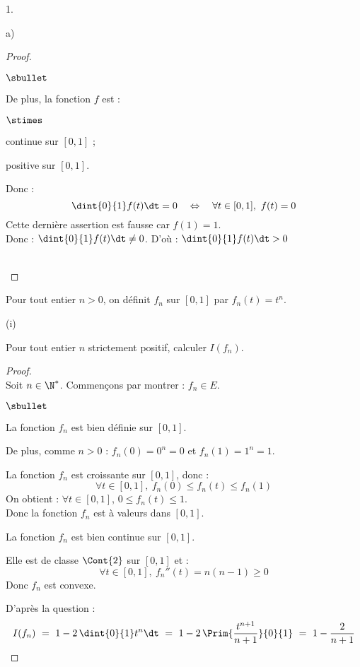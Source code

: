 \begin{noliste}{1.}
\begin{noliste}{a)}
\begin{proof}
\begin{noliste}{$\sbullet$}
      \item De plus, la fonction $f$ est :
      \begin{noliste}{$\stimes$}
	\item continue sur $[0,1]$ ;
	\item positive sur $[0,1]$.
      \end{noliste}
      Donc :
      \[
        \dint{0}{1} f(t) \dt = 0 \quad \Leftrightarrow \quad 
        \forall t \in [0,1], \ f(t)=0
      \]
      Cette dernière assertion est fausse car $f(1)=1$.\\
      Donc : $\dint{0}{1} f(t) \dt \neq 0$. D'où : 
      $\dint{0}{1} f(t) \dt >0$
    \end{noliste}
    ~\\[-1cm]
  \end{proof}

  
  \item Pour tout entier $n >0$, on définit $f_n$ sur $[0,1]$ par 
  $f_n(t)=t^n$.
  \begin{nonoliste}{(i)}
    \item Pour tout entier $n$ strictement positif, calculer $I(f_n)$.
    
    \begin{proof}~\\
    Soit $n\in \N^*$.
	Commençons par montrer : $f_n \in E$.
	\begin{noliste}{$\sbullet$}
	  \item La fonction $f_n$ est bien définie sur $[0,1]$.
	  \item De plus, comme $n>0$ : $f_n(0)=0^n=0$ et $f_n(1)=1^n=1$.
	  
	  \item La fonction $f_n$ est croissante sur $[0,1]$, donc :
	  \[
	    \forall t\in [0,1], \ f_n(0) \leq f_n(t) \leq f_n(1)
	  \]
	  On obtient : $\forall t\in [0,1]$, $0 \leq f_n(t) \leq 
	  1$.\\
	  Donc la fonction $f_n$ est à valeurs dans $[0,1]$.
	  \item La fonction $f_n$ est bien continue sur $[0,1]$.
	  \item Elle est de classe $\Cont{2}$ sur $[0,1]$ et :
	  \[
	    \forall t \in [0,1], \ f_n''(t)=n(n-1)\geq 0
	  \]
	  Donc $f_n$ est convexe.
	\end{noliste}
	
	
	\newpage
	
	
      D'après la question  :
      \[
        I(f_n) \ = \ 1-2\, \dint{0}{1} t^n \dt \ = \ 1- 2 \, \Prim{
        \dfrac{t^{n+1}}{n+1}}{0}{1} \ = \ 1 - \dfrac{2}{n+1}
      \]
      

\end{proof}
\end{nonoliste}
\end{noliste}
\end{noliste}
